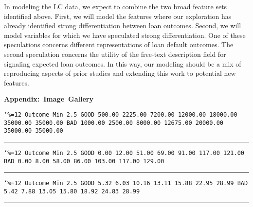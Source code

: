 In modeling the LC data, we expect to combine the two broad feature
sets identified above. First, we will model the features where our
exploration has already identified strong differentiation between loan
outcomes. Second, we will model variables for which we have speculated
strong differentiation. One of these speculations concerns different
representations of loan default outcomes. The second speculation
concerns the utility of the free-text description field for signaling
expected loan outcomes. In this way, our modeling should be a mix of
reproducing aspects of prior studies and extending this work to
potential new features.

\singlecolumn
\vfill\eject
\hbox{\bf Appendix: Image Gallery}


\def\amgverbatim{\parindent=0pt\obeylines\obeyspaces\tt\catcode`\%=12}

\vbox{\amgverbatim{}
Outcome     Min        2.5%
GOOD     500.00     2225.00     7200.00    12000.00    18000.00    35000.00    35000.00
BAD     1000.00     2500.00     8000.00    12675.00    20000.00    35000.00    35000.00
}
\vskip 4pt\hrule\vskip 8pt

\vbox{\amgverbatim{}
Outcome     Min        2.5%
GOOD       0.00       12.00       51.00       69.00       91.00      117.00      121.00
BAD        0.00        8.00       58.00       86.00      103.00      117.00      129.00
}
\vskip 4pt\hrule\vskip 8pt

\vbox{\amgverbatim{}
Outcome     Min        2.5%
GOOD       5.32        6.03       10.16       13.11       15.88       22.95       28.99
BAD        5.42        7.88       13.05       15.80       18.92       24.83       28.99}
\vskip 4pt\hrule\vskip 8pt


\vfill\eject
{}

\hbox{}
\hbox{}

\bye
